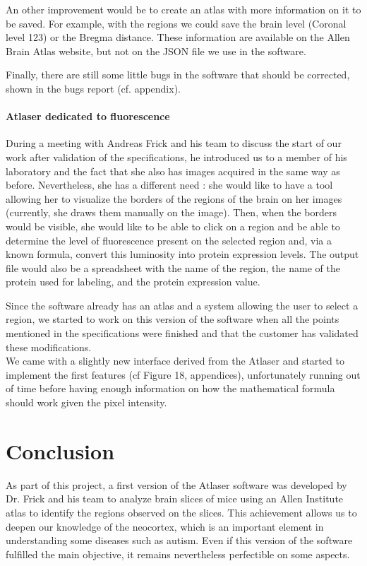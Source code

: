 \documentclass[a4paper,12pt]{report}
\begin{document}
An other improvement would be to create an atlas with more information on it to be saved. For example, with the regions we could save the brain level (Coronal level 123) or the Bregma distance. These information are available on the Allen Brain Atlas website, but not on the JSON file we use in the software.

Finally, there are still some little bugs in the software that should be corrected, shown in the bugs report (cf. appendix).\\

\subsubsection{Atlaser dedicated to fluorescence}
During a meeting with Andreas Frick and his team to discuss the start of our work after validation of the specifications, he introduced us to a member of his laboratory and the fact that she also has images acquired in the same way as before. Nevertheless, she has a different need : she would like to have a tool allowing her to visualize the borders of the regions of the brain on her images (currently, she draws them manually on the image). Then, when the borders would be visible, she would like to be able to click on a region and be able to determine the level of fluorescence present on the selected region and, via a known formula, convert this luminosity into protein expression levels. The output file would also be a spreadsheet with the name of the region, the name of the protein used for labeling, and the protein expression value.

Since the software already has an atlas and a system allowing the user to select a region, we started to work on this version of the software when all the points mentioned in the specifications were finished and that the customer has validated these modifications.\\

We came with a slightly new interface derived from the Atlaser and started to implement the first features (cf Figure 18, appendices), unfortunately running out of time before having enough information on how the mathematical formula should work given the pixel intensity.\\

\chapter*{Conclusion}
As part of this project, a first version of the Atlaser software was developed by Dr. Frick and his team to analyze brain slices of mice using an Allen Institute atlas to identify the regions observed on the slices. This achievement allows us to deepen our knowledge of the neocortex, which is an important element in understanding some diseases such as autism. Even if this version of the software fulfilled the main objective, it remains nevertheless perfectible on some aspects.\\
\end{document}
